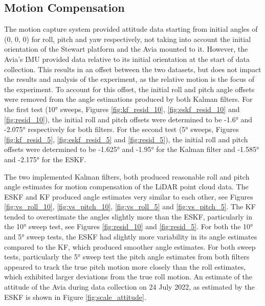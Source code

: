 \subsection{Motion Compensation}
\label{sec:ch7.section1.subsection2}

The motion capture system provided attitude data starting from initial angles of (0, 0, 0) for roll, pitch and yaw respectively, not taking into account the initial orientation of the Stewart platform and the Avia mounted to it. However, the Avia's \ac{IMU} provided data relative to its initial orientation at the start of data collection. This results in an offset between the two datasets, but does not impact the results and analysis of the experiment, as the relative motion is the focus of the experiment. To account for this offset, the initial roll and pitch angle offsets were removed from the angle estimations produced by both Kalman filters. For the first test (10° sweeps, Figures \ref{fig:kf_resid_10}, \ref{fig:eskf_resid_10} and \ref{fig:resid_10}), the initial roll and pitch offsets were determined to be -1.6° and -2.075° respectively for both filters. For the second test (5° sweeps, Figures \ref{fig:kf_resid_5}, \ref{fig:eskf_resid_5} and \ref{fig:resid_5}), the initial roll and pitch offsets were determined to be -1.625° and -1.95° for the Kalman filter and -1.585° and -2.175° for the \ac{ESKF}. 

The two implemented Kalman filters, both produced reasonable roll and pitch angle estimates for motion compensation of the \ac{LiDAR} point cloud data. The \ac{ESKF} and \ac{KF}  produced angle estimates very similar to each other, see Figures \ref{fig:vs_roll_10}, \ref{fig:vs_pitch_10}, \ref{fig:vs_roll_5} and \ref{fig:vs_pitch_5}. The \ac{KF} tended to overestimate the angles slightly more than the \ac{ESKF}, particularly in the 10° sweep test, see Figures \ref{fig:resid_10} and \ref{fig:resid_5}. For both the 10° and 5° sweep tests, the \ac{ESKF} had slightly more variability in its angle estimates compared to the \ac{KF}, which produced smoother angle estimates. For both sweep tests, particularly the 5° sweep test the pitch angle estimates from both filters appeared to track the true pitch motion more closely than the roll estimates, which exhibited larger deviations from the true roll motion. An estimate of the attitude of the Avia during data collection on 24 July 2022, as estimated by the \ac{ESKF} is shown in Figure \ref{fig:scale_attitude}. 

